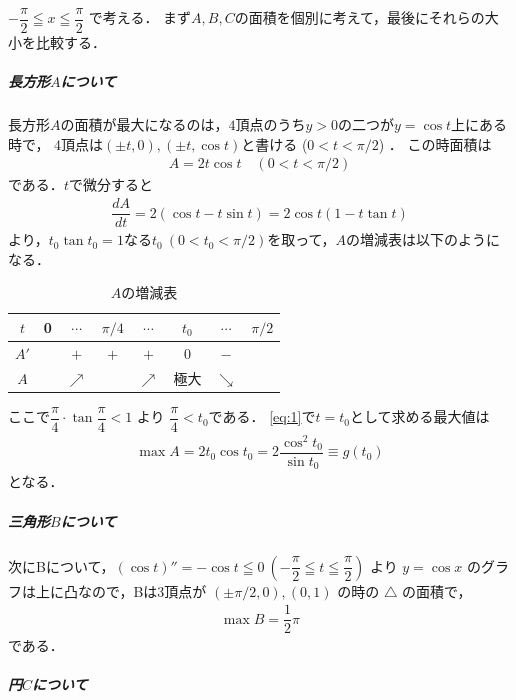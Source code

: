 \documentclass[../../main.tex]{subfiles}
\begin{document}
$-\dfrac{\pi}{2} \leqq x \leqq \dfrac{\pi}{2}$ で考える．
まず$A,B,C$の面積を個別に考えて，最後にそれらの大小を比較する．

\subparagraph{長方形$A$について}

長方形$A$の面積が最大になるのは，$4$頂点のうち$y > 0$の二つが$y=\cos t$上にある時で，
$4$頂点は$(\pm t, 0), (\pm t, \cos t)$と書ける ($0 < t < \pi/2$) ．
この時面積は
\begin{align}
  A = 2t \cos t \quad (0 < t < \pi/2) \label{eq:1}
\end{align}
である．$t$で微分すると
\begin{align}
  \dfrac{dA}{dt} = 2(\cos t - t \sin t) = 2\cos t (1 - t \tan t)
\end{align}
より，$t_0 \tan t_0 = 1$なる$t_0 \ (0<t_0<\pi/2)$を取って，$A$の増減表は以下のようになる．

\begin{table}[htb]
  \centering
  \caption{$A$の増減表}
  \begin{tabular}{c|c|c|c|c|c|c|c}
    $t$ & 0 & $\cdots$ & $\pi/4$ & $\cdots$ & $t_0$ & $\cdots$ & $\pi/2$ \\
    \hline
    $A'$ & & $+$ & $+$ & $+$ & 0 & $-$ & \\
    \hline
    $A$ & & $\nearrow$ & & $\nearrow$ & 極大 & $\searrow$ &
  \end{tabular}
\end{table}

ここで$\dfrac{\pi}{4} \cdot \tan \dfrac{\pi}{4} < 1$ より $\dfrac{\pi}{4} < t_0$である．
\cref{eq:1}で$t=t_0$として求める最大値は
\begin{align}
  \max A = 2 t_0 \cos t_0 = 2 \dfrac{\cos^2 t_0}{\sin t_0} \equiv g(t_0) \label{eq:2}
\end{align}
となる．

\subparagraph{三角形$B$について}

次にBについて，$(\cos t)'' = -\cos t \leqq 0 \ (-\dfrac{\pi}{2} \leqq t \leqq \dfrac{\pi}{2})$ より $y=\cos x$ のグラフは上に凸なので，Bは3頂点が $(\pm \pi/2, 0), (0, 1)$ の時の $\triangle$ の面積で，
\begin{align}
  \max B = \dfrac{1}{2}\pi \label{eq:3}
\end{align}
である．

\subparagraph{円$C$について}
\end{document}
